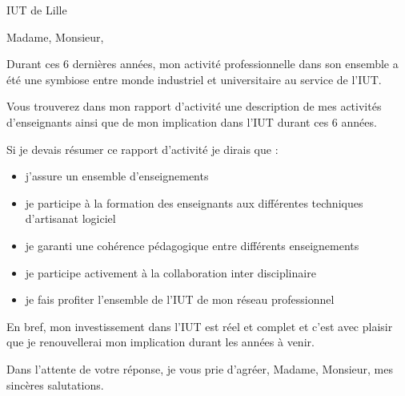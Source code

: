 \documentclass{lettre}
\begin{document}
\begin{letter}{ IUT de Lille }

\address{\textsc{Thomas Clavier}\\45 rue d'Inkermann\\59100 Roubaix}
\nofax
{}

\makeatletter
\def\rule@length{0}
\makeatother


\signature{Thomas Clavier}

\opening{Madame, Monsieur,}

Durant ces 6 dernières années, mon activité professionnelle dans son ensemble a été une symbiose entre monde industriel et universitaire au service de l'IUT.

Vous trouverez dans mon rapport d'activité une description de mes activités d'enseignants ainsi que de mon implication dans l'IUT durant ces 6 années.

Si je devais résumer ce rapport d'activité je dirais que :
\begin{itemize}
  \item j'assure un ensemble d'enseignements
  \item je participe à la formation des enseignants aux différentes techniques d'artisanat logiciel
  \item je garanti une cohérence pédagogique entre différents enseignements
  \item je participe activement à la collaboration inter disciplinaire
  \item je fais profiter l'ensemble de l'IUT de mon réseau professionnel
\end{itemize}

  En bref, mon investissement dans l'IUT est réel et complet et c'est avec plaisir que je renouvellerai mon implication durant les années à venir.

\closing{ Dans l'attente de votre réponse, je vous prie d’agréer, Madame, Monsieur, mes sincères salutations.}

\end{letter}
\end{document}
